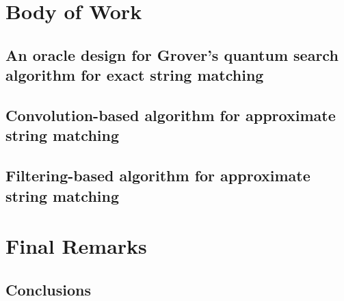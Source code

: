 \documentclass{report}
\begin{document}
            \part{Body of Work}\label{part-body}
                \chapter{An oracle design for Grover's quantum search algorithm for exact string matching}\label{chap:grover}
                    
                \chapter{Convolution-based algorithm for approximate string matching}\label{chap:convolution}
                \chapter{Filtering-based algorithm for approximate string matching}\label{chap:filtering}
            
            \part{Final Remarks}\label{part-final}
                \chapter{Conclusions}\label{chap-conclusions}
            
            \ssp
            
            
            \appendix
        
        
\end{document}
